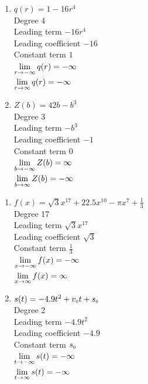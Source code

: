 \begin{multicols}{2}
\begin{enumerate}
\setcounter{enumi}{\value{HW}}

\item $q(r) = 1 - 16r^{4}$\\
Degree 4 \\
Leading term $-16r^{4}$\\
Leading coefficient $-16$\\
Constant term $1$\\
$\displaystyle{\lim_{r \rightarrow - \infty} q(r)  = -\infty}$ \\
$\displaystyle{\lim_{r \rightarrow \infty} q(r)  = -\infty}$ \\


\item $Z(b) = 42b - b^{3}$\\
Degree 3 \\
Leading term $-b^{3}$\\
Leading coefficient $-1$\\
Constant term $0$\\
$\displaystyle{\lim_{b \rightarrow - \infty} Z(b)  = \infty}$ \\
$\displaystyle{\lim_{b \rightarrow  \infty} Z(b)  =  - \infty}$ \\

\setcounter{HW}{\value{enumi}}
\end{enumerate}
\end{multicols}

\begin{multicols}{2}
\begin{enumerate}
\setcounter{enumi}{\value{HW}}

\item $f(x) = \sqrt{3}x^{17} + 22.5x^{10} - \pi x^{7} + \frac{1}{3}$\\
Degree 17 \\
Leading term $\sqrt{3}x^{17}$\\
Leading coefficient $\sqrt{3}$\\
Constant term $\frac{1}{3}$\\
$\displaystyle{\lim_{x \rightarrow - \infty} f(x)  = -\infty}$ \\
$\displaystyle{\lim_{x \rightarrow  \infty} f(x)  = \infty}$ \\



\item $s(t) = -4.9t^{2} + v_{\mbox{\tiny $0$}}t + s_{\mbox{\tiny $0$}}$\\
Degree 2 \\
Leading term $-4.9t^{2}$\\
Leading coefficient $-4.9$\\
Constant term $s_{\mbox{\tiny $0$}}$\\
$\displaystyle{\lim_{t \rightarrow - \infty} s(t)  = -\infty}$ \\
$\displaystyle{\lim_{t \rightarrow  \infty} s(t)  = -\infty}$ \\



\setcounter{HW}{\value{enumi}}
\end{enumerate}
\end{multicols}

